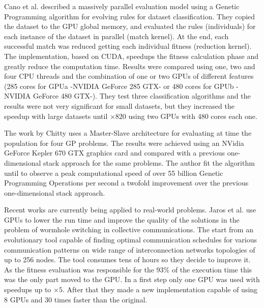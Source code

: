 \documentclass{article}
\begin{document}
Cano et al. \cite{SpeedingTheEvaluationofGPCano:2012} described a massively parallel evaluation model using a Genetic Programming algorithm for evolving rules for dataset classification. They copied the dataset to the GPU global memory, and evaluated the rules (individuals) for each instance of the dataset in parallel (match kernel). At the end, each successful match was reduced getting each individual fitness (reduction kernel). The implementation, based on CUDA, speedups the fitness calculation phase and greatly reduce the computation time. Results were compared using one, two and four CPU threads and the combination of one or two GPUs of different features (285 cores for GPUa -NVIDIA GeForce 285 GTX- or 480 cores for GPUb -NVIDIA GeForce 480 GTX-). They test three classification algorithms and the results were not very significant for small datasets, but they increased the speedup with large datasets until $\times820$ using two GPUs with 480 cores each one.

The work by Chitty \cite{Chitty16FastParallel} uses a Master-Slave architecture for evaluating at time the population for four GP problems. The results were achieved using an NVidia GeForce Kepler 670 GTX graphics card and compared with a previous one-dimensional stack approach for the same problems. The author fit the algorithm until to observe a peak computational speed of over 55 billion Genetic Programming Operations per second a twofold improvement over the previous one-dimensional stack approach.


Recent works are currently being applied to real-world problems. Jaros et al. \cite{Jaros14Wormhole} use GPUs to lower the run time and improve the quality of the solutions in the problem of wormhole switching in collective communications. The start from an evolutionary tool capable of finding optimal communication schedules for various communication patterns on wide range of interconnection networks topologies of up to 256 nodes. The tool consumes tens of hours so they decide to improve it. As the fitness evaluation was responsible for the 93\% of the execution time this was the only part moved to the GPU. In a first step only one GPU was used with speedups up to $\times5$. After that they made a new implementation capable of using 8 GPUs and 30 times faster than the original.
\end{document}
